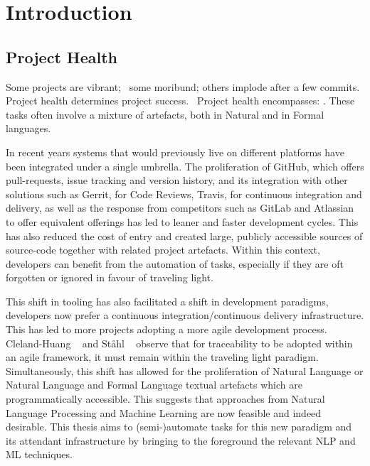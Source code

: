 \chapter{Introduction}
\label{chapter:introduction}


\section{Project Health}
\label{chapter:introduction:sec:proj_health}

Some projects are vibrant;  some moribund; others implode after a few commits.
Project health determines project success.  Project health encompasses:
. These tasks often involve a mixture of artefacts, both in
Natural and in Formal languages. 

In recent years systems that would previously live on different platforms have
been integrated under a single umbrella. The proliferation of GitHub, which
offers pull-requests, issue tracking and version history, and its integration
with other solutions such as Gerrit, for Code Reviews, Travis, for continuous
integration and delivery, as well as the response from competitors such as
GitLab and Atlassian to offer equivalent offerings has led to leaner and faster
development cycles. This has also reduced the cost of entry and created large,
publicly accessible sources of source-code together with related project
artefacts. Within this context, developers can benefit from the automation of
tasks, especially if they are oft forgotten or ignored in favour of traveling
light. 

This shift in tooling has also facilitated a shift in development paradigms,
developers now prefer a continuous integration/continuous delivery
infrastructure. This has led to more projects adopting a more agile development
process. Cleland-Huang \etal~\cite{Cleland-Huang2014} and St{\aa}hl
\etal~\cite{Stahl2017} observe that for traceability to be adopted within an
agile framework, it must remain within the traveling light paradigm.
Simultaneously, this shift has allowed for the proliferation of Natural Language
or Natural Language and Formal Language textual artefacts which are
programmatically accessible. This suggests that approaches from Natural Language
Processing and Machine Learning are now feasible and indeed desirable. This
thesis aims to (semi-)automate tasks for this new paradigm and its attendant
infrastructure by bringing to the foreground the relevant NLP and ML techniques.

